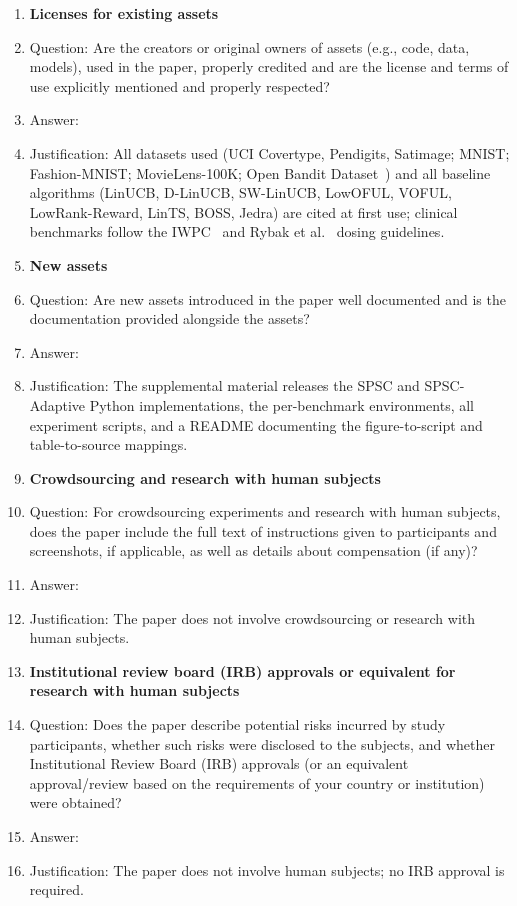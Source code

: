 \begin{enumerate}
\item {\bf Licenses for existing assets}
    \item[] Question: Are the creators or original owners of assets (e.g., code, data, models), used in the paper, properly credited and are the license and terms of use explicitly mentioned and properly respected?
    \item[] Answer: \answerYes{}
    \item[] Justification: All datasets used (UCI Covertype, Pendigits, Satimage; MNIST; Fashion-MNIST; MovieLens-100K; Open Bandit Dataset~\citep{saito2020open}) and all baseline algorithms (LinUCB, D-LinUCB, SW-LinUCB, LowOFUL, VOFUL, LowRank-Reward, LinTS, BOSS, Jedra) are cited at first use; clinical benchmarks follow the IWPC~\citep{international2009estimation} and Rybak et al.~\citep{rybak2020therapeutic} dosing guidelines.

\item {\bf New assets}
    \item[] Question: Are new assets introduced in the paper well documented and is the documentation provided alongside the assets?
    \item[] Answer: \answerYes{}
    \item[] Justification: The supplemental material releases the SPSC and SPSC-Adaptive Python implementations, the per-benchmark environments, all experiment scripts, and a README documenting the figure-to-script and table-to-source mappings.

\item {\bf Crowdsourcing and research with human subjects}
    \item[] Question: For crowdsourcing experiments and research with human subjects, does the paper include the full text of instructions given to participants and screenshots, if applicable, as well as details about compensation (if any)?
    \item[] Answer: \answerNA{}
    \item[] Justification: The paper does not involve crowdsourcing or research with human subjects.

\item {\bf Institutional review board (IRB) approvals or equivalent for research with human subjects}
    \item[] Question: Does the paper describe potential risks incurred by study participants, whether such risks were disclosed to the subjects, and whether Institutional Review Board (IRB) approvals (or an equivalent approval/review based on the requirements of your country or institution) were obtained?
    \item[] Answer: \answerNA{}
    \item[] Justification: The paper does not involve human subjects; no IRB approval is required.


\end{enumerate}
